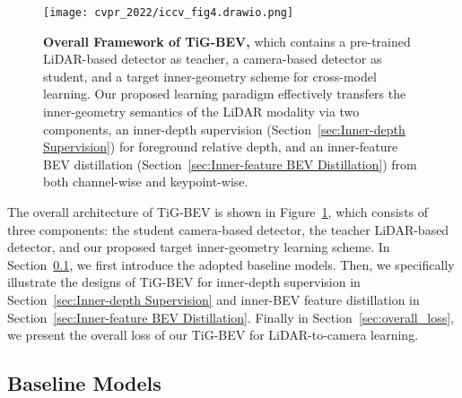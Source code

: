 
\begin{figure}[t!]
  \centering
  \texttt{[image: cvpr\_2022/iccv\_fig4.drawio.png]}
  \caption{\textbf{Overall Framework of TiG-BEV,} which contains a pre-trained LiDAR-based detector as teacher, a camera-based detector as student, and a target inner-geometry scheme for cross-model learning. Our proposed learning paradigm effectively transfers the inner-geometry semantics of the LiDAR modality via two components, an inner-depth supervision (Section~\ref{sec:Inner-depth Supervision}) for foreground relative depth, and an inner-feature BEV distillation (Section~\ref{sec:Inner-feature BEV Distillation}) from both channel-wise and keypoint-wise.}
  \label{fig:framework}
\end{figure}

The overall architecture of TiG-BEV is shown in Figure~\ref{fig:framework}, which consists of three components: the student camera-based detector, the teacher LiDAR-based detector, and our proposed target inner-geometry learning scheme. In Section~\ref{sec:Baseline Models}, we first introduce the adopted baseline models. Then, we specifically illustrate the designs of TiG-BEV for inner-depth supervision in Section~\ref{sec:Inner-depth Supervision} and inner-BEV feature distillation in Section~\ref{sec:Inner-feature BEV Distillation}. Finally in Section~\ref{sec:overall_loss}, we present the overall loss of our TiG-BEV for LiDAR-to-camera learning.

\subsection{Baseline Models}
\label{sec:Baseline Models}
